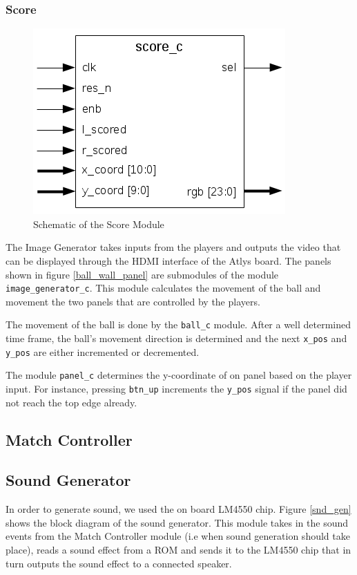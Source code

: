         \subsubsection{Score}
	        \begin{figure}[here]
		        \centering
		        \includegraphics[scale=0.7]{images/score_schematic.png}
		        \caption{Schematic of the Score Module}
		        \label{score_sch}
	        \end{figure}


        The Image Generator takes inputs from the players and outputs the video that can be displayed through the HDMI interface of the Atlys board. The panels shown in figure \ref{ball_wall_panel} are submodules of the module \texttt{image\_generator\_c}.
		This module calculates the movement of the ball and movement the two panels that are controlled by the players. 
		
		The movement of the ball is done by the \texttt{ball\_c} module.
		After a well determined time frame, the ball's movement direction is determined and the next \texttt{x\_pos} and \texttt{y\_pos} are either incremented or decremented. 
		
		The module \texttt{panel\_c} determines the y-coordinate of on panel based on the player input. For instance, pressing \texttt{btn\_up} increments the \texttt{y\_pos} signal if the panel did not reach the top edge already. 


    \subsection{Match Controller}
    
    \newpage
	  \subsection{Sound Generator}
				In order to generate sound, we used the on board LM4550 chip. Figure \ref{snd_gen} shows the block diagram of the sound generator. This module takes in the sound events from the Match Controller module (i.e when sound generation should take place), reads a sound effect from a ROM and sends it to the LM4550 chip that in turn outputs the sound effect to a connected speaker.
				
